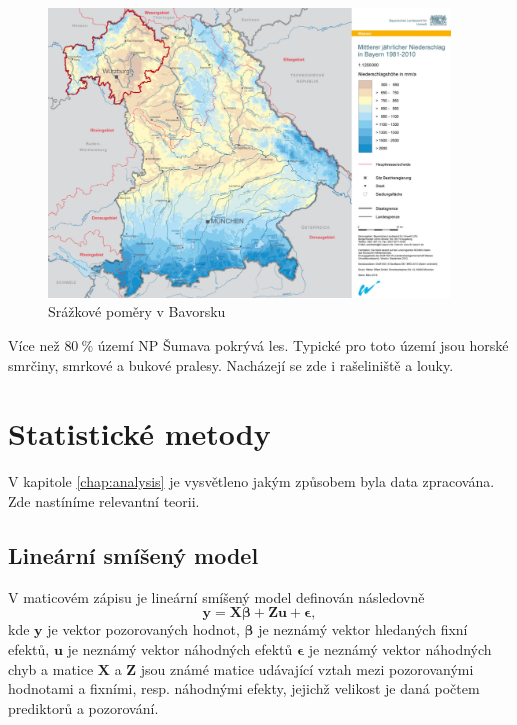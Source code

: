 \begin{figure}
	\centering
	\includegraphics[width=0.95\textwidth]{img/ch1/srazkovepomerybavorskyles.png}
	\caption{Srážkové poměry v Bavorsku\cite{srazkovepomerybavorskyles}}
	\label{fig:srazkovepomerybavorskyles}
\end{figure}

Více než $\SI{80}{\%}$ území NP Šumava pokrývá les. Typické pro toto území jsou horské smrčiny, smrkové a bukové pralesy. Nacházejí se zde i rašeliniště a louky.

\section{Statistické metody}\label{chap:statistika}
V kapitole \ref{chap:analysis} je vysvětleno jakým způsobem byla data zpracována. Zde nastíníme relevantní teorii.

\subsection{Lineární smíšený model}
V maticovém zápisu je lineární smíšený model definován následovně\cite{mcleanrobert1991}
$$\boldsymbol{y} = \boldsymbol{X}\boldsymbol{\beta} + \boldsymbol{Z}\boldsymbol{u} + \boldsymbol{\epsilon},$$ \label{eq:linearmixedeffectmodel}
kde $\mathbf{y}$ je vektor pozorovaných hodnot, $\mathbf{\beta}$ je neznámý vektor hledaných fixní efektů, $\mathbf{u}$ je neznámý vektor náhodných efektů $\mathbf{\epsilon}$ je neznámý vektor náhodných chyb a matice $\mathbf{X}$ a $\mathbf{Z}$ jsou známé matice udávající vztah mezi pozorovanými hodnotami a fixními, resp. náhodnými efekty, jejichž velikost je daná počtem prediktorů a pozorování\cite{mcleanrobert1991}.


